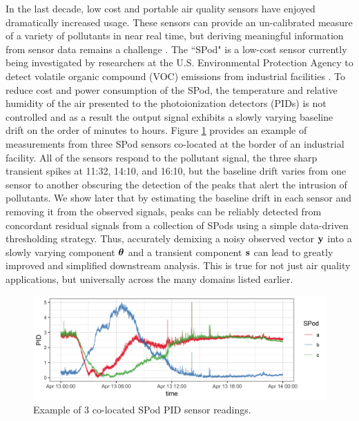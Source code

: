 \documentclass[12pt]{article}
\newcommand{\V}[1]{{\bm{\mathbf{\MakeLowercase{#1}}}}} %
\begin{document}
In the last decade, low cost and portable air quality sensors have enjoyed dramatically increased usage. These sensors can provide an un-calibrated measure of a variety of pollutants in near real time, but deriving meaningful information from sensor data remains a challenge \citep{snyder2013changing}. The ``SPod" is a low-cost sensor currently being investigated by researchers at the U.S. Environmental Protection Agency to detect volatile organic compound (VOC) emissions from industrial facilities \citep{thoma2016south}. To reduce cost and power consumption of the SPod, the temperature and relative humidity of the air presented to the photoionization detectors (PIDs) is not controlled and as a result the output signal exhibits a slowly varying baseline drift on the order of minutes to hours. Figure \ref{fig:raw_spod} provides an example of measurements from three SPod sensors co-located at the border of an industrial facility. All of the sensors respond to the pollutant signal, the three sharp transient spikes at 11:32, 14:10, and 16:10, but the baseline drift varies from one sensor to another obscuring the detection of the peaks that alert the intrusion of pollutants. We show later that by estimating the baseline drift in each sensor %
 and  removing it from the observed signals, peaks can be reliably detected from concordant residual signals from a collection of SPods using a simple data-driven thresholding strategy. Thus, accurately demixing a noisy observed vector $\V{y}$ into a slowly varying component $\V{\theta}$ and a transient component $\V{s}$ can lead to greatly improved and simplified downstream analysis. This is true for not just air quality applications, but universally across the many domains listed earlier.

	\begin{figure}[t!]
		\includegraphics[width = \linewidth]{Figures/uncorrected_data.png}		
		\caption{Example of 3 co-located SPod PID sensor readings.}
		\label{fig:raw_spod}
	\end{figure}	
\end{document}
